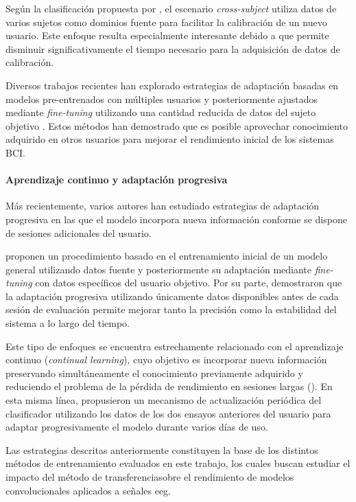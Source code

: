 Según la clasificación propuesta por \textcite{wu_TransferLearning2020}, el escenario \textit{cross-subject} utiliza datos de varios sujetos como dominios fuente para facilitar la calibración de un nuevo usuario. Este enfoque resulta especialmente interesante debido a que permite disminuir significativamente el tiempo necesario para la adquisición de datos de calibración.

Diversos trabajos recientes han explorado estrategias de adaptación basadas en modelos pre-entrenados con múltiples usuarios y posteriormente ajustados mediante \textit{fine-tuning} utilizando una cantidad reducida de datos del sujeto objetivo \textcite{otarbay_TransferLearning2026,an_SubjectAdaptiveTransfer2024}. Estos métodos han demostrado que es posible aprovechar conocimiento adquirido en otros usuarios para mejorar el rendimiento inicial de los sistemas BCI.

\paragraph*{Aprendizaje continuo y adaptación progresiva}

Más recientemente, varios autores han estudiado estrategias de adaptación progresiva en las que el modelo incorpora nueva información conforme se dispone de sesiones adicionales del usuario.

\textcite{lu_HybridTransfer2023} proponen un procedimiento basado en el entrenamiento inicial de un modelo general utilizando datos fuente y posteriormente su adaptación mediante \textit{fine-tuning} con datos específicos del usuario objetivo. Por su parte, \textcite{wimpff_FineTuningStrategies2025} demostraron que la adaptación progresiva utilizando únicamente datos disponibles antes de cada sesión de evaluación permite mejorar tanto la precisión como la estabilidad del sistema a lo largo del tiempo.

Este tipo de enfoques se encuentra estrechamente relacionado con el aprendizaje continuo (\textit{continual learning}), cuyo objetivo es incorporar nueva información preservando simultáneamente el conocimiento previamente adquirido y reduciendo el problema de la pérdida de rendimiento en sesiones largas (\textcite{huang_ContinualLearningEnhancedCNN2026}). En esta misma línea, \textcite{abu-rmileh_CoadaptiveTraining2019} propusieron un mecanismo de actualización periódica del clasificador utilizando los datos de los dos ensayos anteriores del usuario para adaptar progresivamente el modelo durante varios días de uso.

Las estrategias descritas anteriormente constituyen la base de los distintos métodos de entrenamiento evaluados en este trabajo, los cuales buscan estudiar el impacto del método de transferenciasobre el rendimiento de modelos convolucionales aplicados a señales \acrshort{eeg}.
